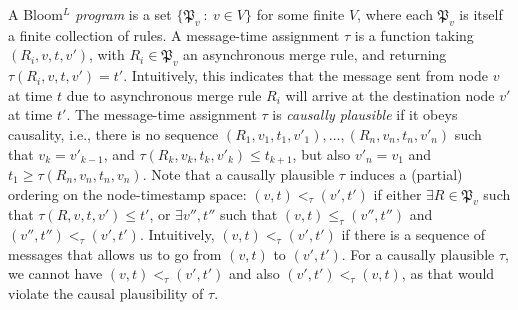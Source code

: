 A Bloom$^L$ \emph{program} is a set $\{\mathfrak{P}_v ~:~ v \in V\}$ for some finite $V$, where each $\mathfrak{P}_v$ is itself a finite collection of rules.
A message-time assignment $\tau$ is a function taking $(R_i, v, t, v')$, with $R_i \in \mathfrak{P}_v$ an asynchronous merge rule, and returning $\tau(R_i, v, t, v') = t'$.
Intuitively, this indicates that the message sent from node $v$ at time $t$ due to asynchronous merge rule $R_i$ will arrive at the destination node $v'$ at time $t'$.
The message-time assignment $\tau$ is \emph{causally plausible} if it obeys causality, i.e., there is no sequence $(R_1, v_1, t_1, v'_1), \dots, (R_n, v_n, t_n, v'_n)$ such that $v_k = v'_{k-1}$, and $\tau(R_k, v_k, t_k, v'_k) \leq t_{k+1}$, but also $v'_n = v_1$ and $t_1 \geq \tau(R_n, v_n, t_n, v_n)$.
Note that a causally plausible $\tau$ induces a (partial) ordering on the node-timestamp space: $(v,t) <_\tau (v',t')$ if either $\exists R \in \mathfrak{P}_v$ such that $\tau(R,v,t,v') \leq t'$, or $\exists v'', t''$ such that $(v,t) \leq_\tau (v'', t'')$ and $(v'', t'') <_\tau (v',t')$.
Intuitively, $(v,t) <_\tau (v',t')$ if there is a sequence of messages that allows us to go from $(v,t)$ to $(v',t')$.
For a causally plausible $\tau$, we cannot have $(v,t) <_\tau (v',t')$ and also $(v',t') <_\tau (v,t)$, as that would violate the causal plausibility of $\tau$. 

